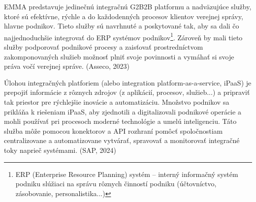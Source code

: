 



EMMA predstavuje jedinečnú integračnú G2B2B platformu a nadväzujúce služby, ktoré sú efektívne, rýchle a  do každodenných procesov klientov verejnej správy, hlavne podnikov. Tieto služby sú navrhnuté a poskytované tak, aby sa dali čo najjednoduchšie integrovať do ERP systémov podnikov\footnote{ERP (Enterprise Resource Planning) systém -- interný informačný systém podniku slúžiaci na správu rôznych činností podniku (účtovníctvo, zásobovanie, personalistika...)}. Zároveň by mali tieto služby podporovať podnikové procesy a zaisťovať prostredníctvom zakomponovaných služieb možnosť plniť svoje povinnosti a vymáhať si svoje práva vočí verejnej správe. \scr(Asseco, 2023)

Úlohou integračných platforiem (alebo integration platform-as-a-service, \zlom iPaaS) je prepojiť informácie z rôznych zdrojov (z aplikácií, procesov, služieb...) a pripraviť tak priestor pre rýchlejšie inovácie a automatizáciu. Množstvo podnikov sa prikláňa k riešeniam iPaaS, aby zjednotili a digitalizovali podnikové operácie a mohli používať pri procesoch moderné technológie a umelú inteligenciu. Táto služba môže pomocou konektorov a API rozhraní pomôcť spoločnostiam centralizovane a automatizovane vytvárať, spravovať a monitorovať integračné toky naprieč systémami. \scr(SAP, 2024)

